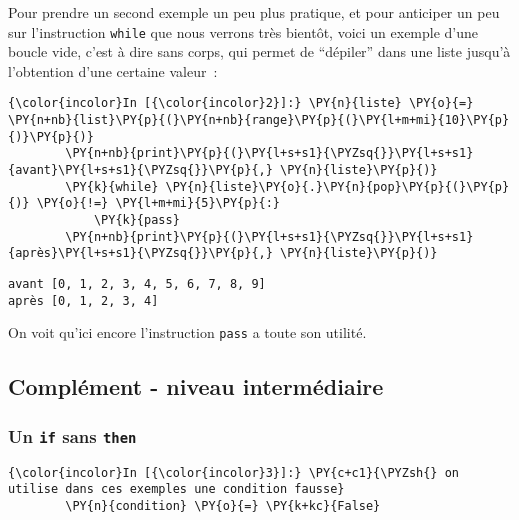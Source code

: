     Pour prendre un second exemple un peu plus pratique, et pour anticiper
un peu sur l'instruction \texttt{while} que nous verrons très bientôt,
voici un exemple d'une boucle vide, c'est à dire sans corps, qui permet
de ``dépiler'' dans une liste jusqu'à l'obtention d'une certaine
valeur~:

    \begin{Verbatim}[commandchars=\\\{\}]
{\color{incolor}In [{\color{incolor}2}]:} \PY{n}{liste} \PY{o}{=} \PY{n+nb}{list}\PY{p}{(}\PY{n+nb}{range}\PY{p}{(}\PY{l+m+mi}{10}\PY{p}{)}\PY{p}{)}
        \PY{n+nb}{print}\PY{p}{(}\PY{l+s+s1}{\PYZsq{}}\PY{l+s+s1}{avant}\PY{l+s+s1}{\PYZsq{}}\PY{p}{,} \PY{n}{liste}\PY{p}{)}
        \PY{k}{while} \PY{n}{liste}\PY{o}{.}\PY{n}{pop}\PY{p}{(}\PY{p}{)} \PY{o}{!=} \PY{l+m+mi}{5}\PY{p}{:}
            \PY{k}{pass}
        \PY{n+nb}{print}\PY{p}{(}\PY{l+s+s1}{\PYZsq{}}\PY{l+s+s1}{après}\PY{l+s+s1}{\PYZsq{}}\PY{p}{,} \PY{n}{liste}\PY{p}{)}
\end{Verbatim}


    \begin{Verbatim}[commandchars=\\\{\}]
avant [0, 1, 2, 3, 4, 5, 6, 7, 8, 9]
après [0, 1, 2, 3, 4]

    \end{Verbatim}

    On voit qu'ici encore l'instruction \texttt{pass} a toute son utilité.

    \hypertarget{compluxe9ment---niveau-intermuxe9diaire}{%
\subsection{Complément - niveau
intermédiaire}\label{compluxe9ment---niveau-intermuxe9diaire}}

    \hypertarget{un-if-sans-then}{%
\subsubsection{\texorpdfstring{Un \texttt{if} sans
\texttt{then}}{Un if sans then}}\label{un-if-sans-then}}

    \begin{Verbatim}[commandchars=\\\{\}]
{\color{incolor}In [{\color{incolor}3}]:} \PY{c+c1}{\PYZsh{} on utilise dans ces exemples une condition fausse}
        \PY{n}{condition} \PY{o}{=} \PY{k+kc}{False}
\end{Verbatim}


